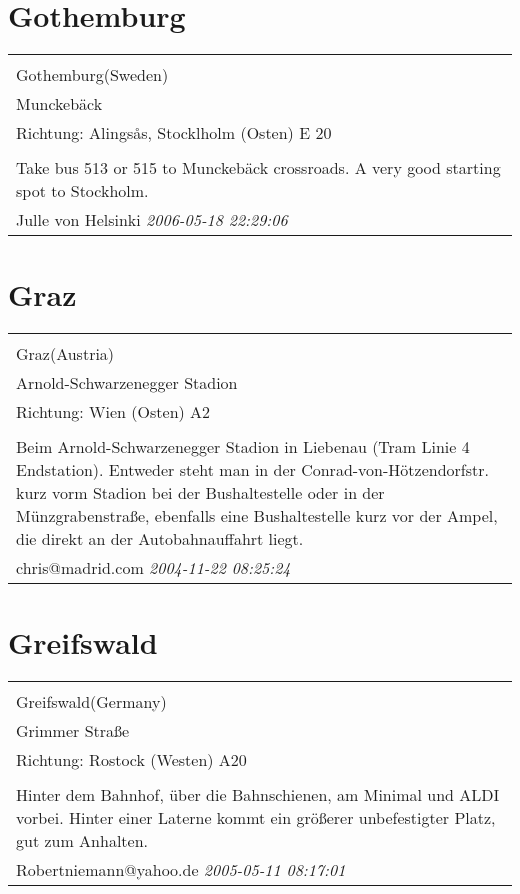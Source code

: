 \documentclass[a4paper,12pt]{article}
\begin{document}
\section{Gothemburg}
\begin{tabular}{|p{13cm}|}
\hline\\
Gothemburg(Sweden)\\
Munckebäck\\
Richtung: Alingsås, Stocklholm (Osten) E 20 \\
\hline\\
Take bus 513 or 515 to Munckebäck crossroads. A very good starting spot to Stockholm. \\
Julle von Helsinki \textit{ 2006-05-18 22:29:06 }\\\hline
\end{tabular}


\section{Graz}
\begin{tabular}{|p{13cm}|}
\hline\\
Graz(Austria)\\
Arnold-Schwarzenegger Stadion\\
Richtung: Wien (Osten) A2 \\
\hline\\
Beim Arnold-Schwarzenegger Stadion in Liebenau (Tram Linie 4 Endstation). Entweder steht man in der Conrad-von-Hötzendorfstr. kurz vorm Stadion bei der Bushaltestelle oder in der Münzgrabenstraße, ebenfalls eine Bushaltestelle kurz vor der Ampel, die direkt an der Autobahnauffahrt liegt. \\
chris@madrid.com \textit{ 2004-11-22 08:25:24 }\\\hline
\end{tabular}


\section{Greifswald}
\begin{tabular}{|p{13cm}|}
\hline\\
Greifswald(Germany)\\
Grimmer Straße\\
Richtung: Rostock (Westen) A20 \\
\hline\\
Hinter dem Bahnhof, über die Bahnschienen, am Minimal und ALDI vorbei. Hinter einer Laterne kommt ein größerer unbefestigter Platz, gut zum Anhalten. \\
Robertniemann@yahoo.de \textit{ 2005-05-11 08:17:01 }\\\hline
\end{tabular}
\end{document}
